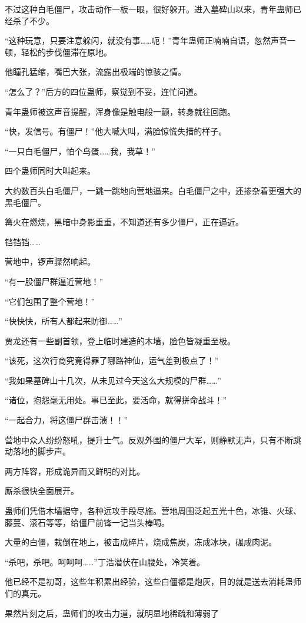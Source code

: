 \begin{this_body}
不过这种白毛僵尸，攻击动作一板一眼，很好躲开。进入墓碑山以来，青年蛊师已经杀了不少。

“这种玩意，只要注意躲闪，就没有事……呃！”青年蛊师正喃喃自语，忽然声音一顿，轻松的步伐僵滞在原地。

他瞳孔猛缩，嘴巴大张，流露出极端的惊骇之情。

“怎么了？”后方的四位蛊师，察觉到不妥，连忙问道。

青年蛊师被这声音提醒，浑身像是触电般一颤，转身就往回跑。

“快，发信号。有僵尸！”他大喊大叫，满脸惊慌失措的样子。

“一只白毛僵尸，怕个鸟蛋……我，我草！”

四个蛊师同时大叫起来。

大约数百头白毛僵尸，一跳一跳地向营地逼来。白毛僵尸之中，还掺杂着更强大的黑毛僵尸。

篝火在燃烧，黑暗中身影重重，不知道还有多少僵尸，正在逼近。

铛铛铛……

营地中，锣声骤然响起。

“有一股僵尸群逼近营地！”

“它们包围了整个营地！”

“快快快，所有人都起来防御……”

贾龙还有一些副首领，登上临时建造的木墙，脸色皆凝重至极。

“该死，这次行商究竟得罪了哪路神仙，运气差到极点了！”

“我如果墓碑山十几次，从未见过今天这么大规模的尸群……”

“诸位，抱怨毫无用处。事已至此，要活命，就得拼命战斗！”

“一起合力，将这僵尸群击溃！！”

营地中众人纷纷怒吼，提升士气。反观外围的僵尸大军，则静默无声，只有不断跳动落地的脚步声。

两方阵容，形成诡异而又鲜明的对比。

厮杀很快全面展开。

蛊师们凭借木墙据守，各种远攻手段尽施。营地周围泛起五光十色，冰锥、火球、藤蔓、滚石等等，给僵尸前锋一记当头棒喝。

大量的白僵，栽倒在地上，被击成碎片，烧成焦炭，冻成冰块，碾成肉泥。

“杀吧，杀吧。呵呵呵……”丁浩潜伏在山腰处，冷笑着。

他已经不是初哥，这些年积累出经验，这些白僵都是炮灰，目的就是送去消耗蛊师们的真元。

果然片刻之后，蛊师们的攻击力道，就明显地稀疏和薄弱了


\end{this_body}
